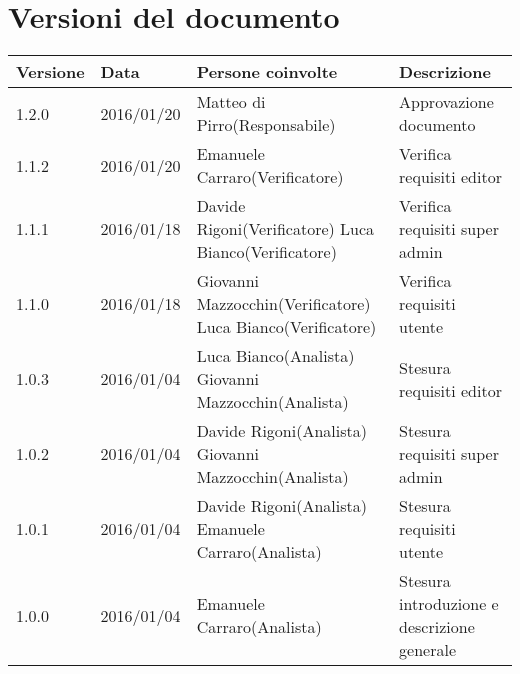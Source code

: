 \section{Versioni del documento}

\begin{center}

\begin{tabular}{| p{1.5cm} | p{2cm} | p{6cm} | p{4.5cm} | }
  \textbf{Versione} & \textbf{Data} & \textbf{Persone coinvolte} & \textbf{Descrizione}\\ \hline
  1.2.0 & 2016/01/20 & Matteo di Pirro(Responsabile) & Approvazione documento\\ \hline 
  1.1.2 & 2016/01/20 & Emanuele Carraro(Verificatore) & Verifica requisiti editor\\ \hline 
      1.1.1 & 2016/01/18 & Davide Rigoni(Verificatore) Luca Bianco(Verificatore) & Verifica requisiti super admin\\ \hline
      1.1.0 & 2016/01/18 & Giovanni Mazzocchin(Verificatore) Luca Bianco(Verificatore)& Verifica requisiti utente\\ \hline
      1.0.3 & 2016/01/04 & Luca Bianco(Analista) Giovanni Mazzocchin(Analista) & Stesura requisiti editor\\ \hline
      1.0.2 & 2016/01/04 & Davide Rigoni(Analista) Giovanni Mazzocchin(Analista) & Stesura requisiti super admin\\ \hline
      1.0.1 & 2016/01/04 & Davide Rigoni(Analista) Emanuele Carraro(Analista) & Stesura requisiti utente\\ \hline
      1.0.0 & 2016/01/04 & Emanuele Carraro(Analista) & Stesura introduzione e descrizione generale \\ \hline
\end{tabular}
  
\end{center}